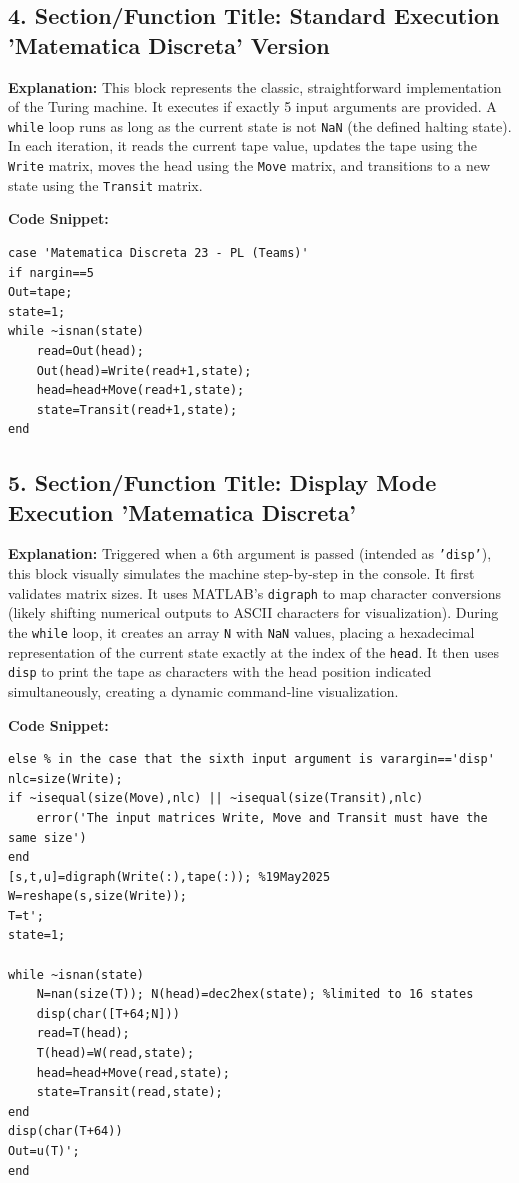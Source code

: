 \subsection*{4. Section/Function Title: Standard Execution 'Matematica Discreta' Version}
\textbf{Explanation:} This block represents the classic, straightforward implementation of the Turing machine. It executes if exactly 5 input arguments are provided. A \texttt{while} loop runs as long as the current state is not \texttt{NaN} (the defined halting state). In each iteration, it reads the current tape value, updates the tape using the \texttt{Write} matrix, moves the head using the \texttt{Move} matrix, and transitions to a new state using the \texttt{Transit} matrix.

\textbf{Code Snippet:}
\begin{lstlisting}
case 'Matematica Discreta 23 - PL (Teams)'
if nargin==5
Out=tape;
state=1;
while ~isnan(state)
    read=Out(head);
    Out(head)=Write(read+1,state);
    head=head+Move(read+1,state);
    state=Transit(read+1,state);
end
\end{lstlisting}

\subsection*{5. Section/Function Title: Display Mode Execution 'Matematica Discreta'}
\textbf{Explanation:} Triggered when a 6th argument is passed (intended as \texttt{'disp'}), this block visually simulates the machine step-by-step in the console. It first validates matrix sizes. It uses MATLAB's \texttt{digraph} to map character conversions (likely shifting numerical outputs to ASCII characters for visualization). During the \texttt{while} loop, it creates an array \texttt{N} with \texttt{NaN} values, placing a hexadecimal representation of the current state exactly at the index of the \texttt{head}. It then uses \texttt{disp} to print the tape as characters with the head position indicated simultaneously, creating a dynamic command-line visualization.

\textbf{Code Snippet:}
\begin{lstlisting}
else % in the case that the sixth input argument is varargin=='disp'
nlc=size(Write);
if ~isequal(size(Move),nlc) || ~isequal(size(Transit),nlc)
    error('The input matrices Write, Move and Transit must have the same size')
end
[s,t,u]=digraph(Write(:),tape(:)); %19May2025
W=reshape(s,size(Write));
T=t';
state=1;

while ~isnan(state)
    N=nan(size(T)); N(head)=dec2hex(state); %limited to 16 states
    disp(char([T+64;N]))
    read=T(head);
    T(head)=W(read,state);
    head=head+Move(read,state);
    state=Transit(read,state);
end
disp(char(T+64))
Out=u(T)';
end
\end{lstlisting}

